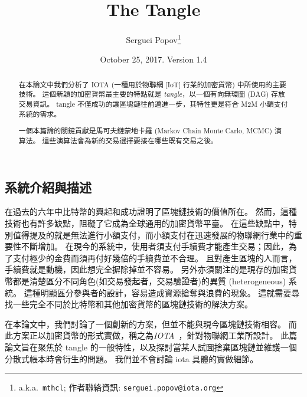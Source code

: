 \documentclass[12pt]{article}
\title{The Tangle}
\author{Serguei Popov\thanks{
a.k.a.\ \texttt{mthcl}; 作者聯絡資訊:
\texttt{serguei.popov@iota.org}}
}
\date{October 25, 2017. Version 1.4}
\begin{document}
\begin{CJK}{UTF8}{bkai}
 \maketitle
\begin{abstract}  

在本論文中我們分析了 IOTA (一種用於物聯網 [IoT] 行業的加密貨幣) 中所使用的主要技術。
這個新穎的加密貨幣最主要的特點就是 \emph{tangle}，以一個有向無環圖 (DAG) 存放交易資訊。
tangle 不僅成功的讓區塊鏈往前邁進一步，其特性更是符合 M2M 小額支付系統的需求。

一個本篇論的關鍵貢獻是馬可夫鏈蒙地卡羅 (Markov Chain Monte Carlo, MCMC) 演算法。
這些演算法會為新的交易選擇要接在哪些既有交易之後。                                        

\end{abstract}

\section{系統介紹與描述}
\label{s_general}

在過去的六年中比特幣的興起和成功證明了區塊鏈技術的價值所在。
然而，這種技術也有許多缺點，阻礙了它成為全球通用的加密貨幣平臺。
在這些缺點中，特別值得提及的就是無法進行小額支付，而小額支付在迅速發展的物聯網行業中的重要性不斷增加。
在現今的系統中，使用者須支付手續費才能產生交易；因此，為了支付極少的金費而須再付好幾倍的手續費並不合理。
且對產生區塊的人而言，手續費就是動機，因此想完全摒除掉並不容易。
另外亦須關注的是現存的加密貨幣都是清楚區分不同角色(如交易發起者，交易驗證者)的異質 (heterogeneous) 系統。
這種明顯區分參與者的設計，容易造成資源搶奪與浪費的現象。
這就需要尋找一些完全不同於比特幣和其他加密貨幣的區塊鏈技術的解決方案。

在本論文中，我們討論了一個創新的方案，但並不能與現今區塊鏈技術相容。
而此方案正以加密貨幣的形式實做，稱之為\emph{IOTA}~\cite{iota}，針對物聯網工業所設計。
此篇論文旨在聚焦於 tangle 的一般特性，以及探討當某人試圖捨棄區塊鏈並維護一個分散式帳本時會衍生的問題。
我們並不會討論 iota 具體的實做細節。


\end{CJK}
\end{document}
